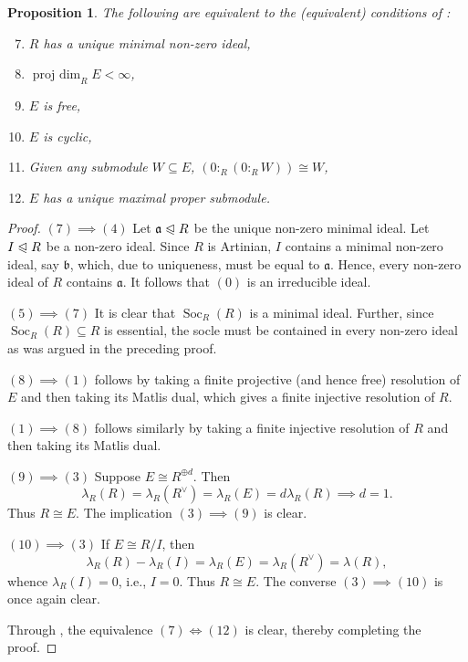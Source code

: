 \documentclass[10pt]{article}
\theoremstyle{thmstyle}
\newtheorem{proposition}[theorem]{Proposition}
\theoremstyle{defstyle}
\newcommand{\fraka}{\mathfrak{a}} %
\newcommand{\frakb}{\mathfrak{b}} %
\newcommand{\noreq}{\trianglelefteqslant}
\newcommand{\Soc}{\operatorname{Soc}}
\newcommand{\projdim}{\operatorname{proj~dim}}
\begin{document}
\begin{proposition}
    The following are equivalent to the (equivalent) conditions of : 
    \begin{enumerate}[label=(\arabic*)]
        \setcounter{enumi}{6}
        \item $R$ has a unique minimal non-zero ideal, 
        \item $\projdim_R E < \infty$, 
        \item $E$ is free, 
        \item $E$ is cyclic, 
        \item Given any submodule $W\subseteq E$, $\left(0:_R\left(0:_R W\right)\right)\cong W$, 
        \item $E$ has a unique maximal proper submodule.
    \end{enumerate}
\end{proposition}
\begin{proof}
    $(7)\implies(4)$ Let $\fraka\noreq R$ be the unique non-zero minimal ideal. Let $I\noreq R$ be a non-zero ideal. Since $R$ is Artinian, $I$ contains a minimal non-zero ideal, say $\frakb$, which, due to uniqueness, must be equal to $\fraka$. Hence, every non-zero ideal of $R$ contains $\fraka$. It follows that $(0)$ is an irreducible ideal.

    $(5)\implies(7)$ It is clear that $\Soc_R(R)$ is a minimal ideal. Further, since $\Soc_R(R)\subseteq R$ is essential, the socle must be contained in every non-zero ideal as was argued in the preceding proof.

    $(8)\implies(1)$ follows by taking a finite projective (and hence free) resolution of $E$ and then taking its Matlis dual, which gives a finite injective resolution of $R$.

    $(1)\implies(8)$ follows similarly by taking a finite injective resolution of $R$ and then taking its Matlis dual.

    $(9)\implies(3)$ Suppose $E\cong R^{\oplus d}$. Then 
    \begin{equation*}
        \lambda_R(R) = \lambda_R(R^\vee) = \lambda_R(E) = d\lambda_R(R)\implies d = 1.  \end{equation*}
    Thus $R\cong E$. The implication $(3)\implies(9)$ is clear.

    $(10)\implies(3)$ If $E\cong R/I$, then 
    \begin{equation*}
        \lambda_R(R) - \lambda_R(I) = \lambda_R(E) = \lambda_R(R^\vee) = \lambda(R),
    \end{equation*}
    whence $\lambda_R(I) = 0$, i.e., $I = 0$. Thus $R\cong E$. The converse $(3)\implies(10)$ is once again clear.


    Through , the equivalence $(7)\iff(12)$ is clear, thereby completing the proof.
\end{proof}
\end{document}
